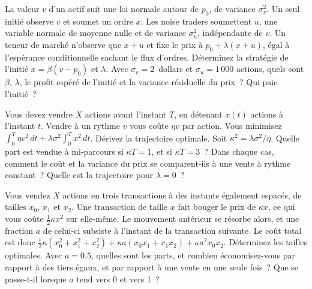 \begin{question}\label{iq:iv2:markets-and-microstructure:48}
La valeur $v$ d'un actif suit une loi normale autour de $p_0$, de variance $\sigma_v^2$. Un seul initié observe $v$ et soumet un ordre $x$. Les noise traders soumettent $u$, une variable normale de moyenne nulle et de variance $\sigma_u^2$, indépendante de $v$. Un teneur de marché n'observe que $x + u$ et fixe le prix à $p_0 + \lambda(x + u)$, égal à l'espérance conditionnelle sachant le flux d'ordres. Déterminez la stratégie de l'initié $x = \beta(v - p_0)$ et $\lambda$. Avec $\sigma_v = 2$~dollars et $\sigma_u = 1\,000$ actions, quels sont $\beta$, $\lambda$, le profit espéré de l'initié et la variance résiduelle du prix~? Qui paie l'initié~?
\end{question}

\begin{question}\label{iq:iv2:markets-and-microstructure:49}
Vous devez vendre $X$ actions avant l'instant $T$, en détenant $x(t)$ actions à l'instant $t$. Vendre à un rythme $v$ vous coûte $\eta v$ par action. Vous minimisez $\int_0^T \eta v^2\,dt + \lambda\sigma^2\int_0^T x^2\,dt$. Dérivez la trajectoire optimale. Soit $\kappa^2 = \lambda\sigma^2/\eta$. Quelle part est vendue à mi-parcours si $\kappa T = 1$, et si $\kappa T = 3$~? Dans chaque cas, comment le coût et la variance du prix se comparent-ils à une vente à rythme constant~? Quelle est la trajectoire pour $\lambda = 0$~?
\end{question}

\begin{question}\label{iq:iv2:markets-and-microstructure:50}
Vous vendez $X$ actions en trois transactions à des instants également espacés, de tailles $x_0$, $x_1$ et $x_2$. Une transaction de taille $x$ fait bouger le prix de $\kappa x$, ce qui vous coûte $\tfrac12\kappa x^2$ sur elle-même. Le mouvement antérieur se résorbe alors, et une fraction $a$ de celui-ci subsiste à l'instant de la transaction suivante. Le coût total est donc $\tfrac12\kappa\left(x_0^2 + x_1^2 + x_2^2\right) + \kappa a\left(x_0x_1 + x_1x_2\right) + \kappa a^2 x_0x_2$. Déterminez les tailles optimales. Avec $a = 0.5$, quelles sont les parts, et combien économisez-vous par rapport à des tiers égaux, et par rapport à une vente en une seule fois~? Que se passe-t-il lorsque $a$ tend vers 0 et vers 1~?
\end{question}
